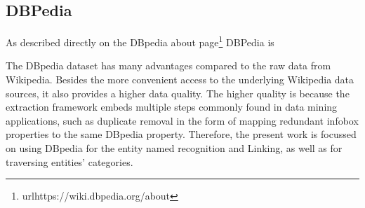 



\subsection{\hspace*{3pt} DBPedia}

As described directly on the DBpedia about page\footnote{url{https://wiki.dbpedia.org/about}} DBPedia is 

\begin{displayquote}
\end{displayquote}


The DBpedia dataset has many advantages compared to the raw data from Wikipedia. Besides the more convenient access to the underlying Wikipedia data sources, it also provides a higher data quality. The higher quality is because the extraction framework embeds multiple steps commonly found in data mining applications, such as duplicate removal in the form of mapping redundant infobox properties to the same DBpedia property.
Therefore, the present work is focussed on using DBpedia for the entity named recognition and Linking, as well as for traversing entities' categories.


